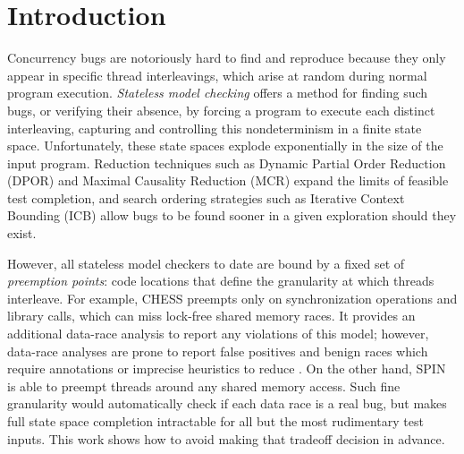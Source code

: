 \section{Introduction}

Concurrency bugs are notoriously hard to find and reproduce because they only appear in specific thread interleavings, which arise at random during normal program execution.
{\em Stateless model checking} \cite{verisoft} offers a method for finding such bugs,
or verifying their absence,
by forcing a program to execute each distinct interleaving,
capturing and controlling this nondeterminism in a finite state space.
Unfortunately, these state spaces explode exponentially in the size of the input program.
Reduction techniques such as Dynamic Partial Order Reduction (DPOR) \cite{dpor} and Maximal Causality Reduction (MCR) \cite{mcr} expand the limits of feasible test completion,
and search ordering strategies such as Iterative Context Bounding (ICB) \cite{chess} allow bugs to be found sooner in a given exploration should they exist.

However, all stateless model checkers to date are bound by a fixed set of {\em preemption points}: code locations that define the granularity at which threads interleave.
For example, \textsc{CHESS} \cite{chess} preempts only on synchronization operations and library calls, which can miss lock-free shared memory races.
It provides an additional data-race analysis to report any violations of this model;
however, data-race analyses are prone to report false positives and benign races which require annotations or imprecise heuristics to reduce \cite{racerx,tsan,datacollider}.
%
On the other hand, SPIN \cite{spin}
is able to preempt threads around any shared memory access. Such fine granularity would automatically check if each data race is a real bug, but makes full state space completion intractable for all but the most rudimentary test inputs.
%
This work shows how to avoid making that tradeoff decision in advance.

